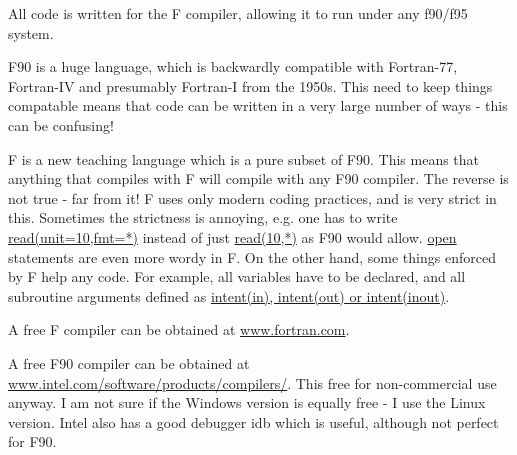 \documentclass[12pt]{article}
\begin{document}
All code is written for the F compiler, allowing it to run under any f90/f95 system.

\vspace{0.5cm}

F90 is a huge language, which is backwardly compatible with Fortran-77, Fortran-IV
and presumably Fortran-I from the 1950s. This need to keep things compatable means
that code can be written in a very large number of ways - this can be
confusing!


F is a new teaching language which is a pure subset of F90. This means that anything
that compiles with F will compile with any F90 compiler. The reverse is not true - far from it!
F uses only modern coding practices, and is very strict in this. Sometimes the
strictness is annoying, e.g. one has to write \url{read(unit=10,fmt=*)} instead
of just \url{read(10,*)} as F90 would allow. \url{open} statements are even more wordy in F. On the
other hand, some things enforced by F help any code. For example, all variables
have to be declared, and all subroutine arguments defined as \url{intent(in), intent(out) or intent(inout)}. 
\vspace{0.3cm}


A free F compiler can be obtained at \url{www.fortran.com}.
\vspace{0.3cm}

A free F90 compiler can 
be obtained at \url{www.intel.com/software/products/compilers/}.
This free for non-commercial use anyway. I am not sure
if the Windows version is equally free - I use the Linux version.
Intel also has a good debugger idb which is useful, although not perfect
for F90.
\end{document}
